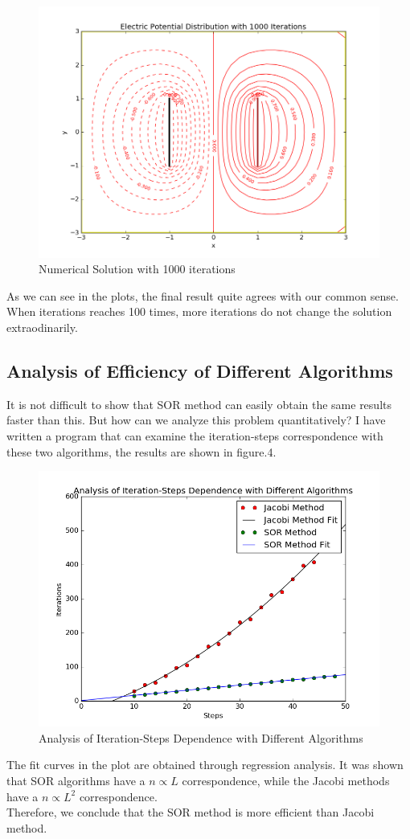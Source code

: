 \documentclass[10pt,a4paper]{article}
\begin{document}
	\begin{figure}[htbp]
		\centering
		\includegraphics[width=5in]{laplace_3.png}
		\caption{Numerical Solution with 1000 iterations}
	\end{figure}
	As we can see in the plots, the final result quite agrees with our common sense. When iterations reaches 100 times, more iterations do not change the solution extraodinarily. 
	
	\subsection{Analysis of Efficiency of Different Algorithms}
	It is not difficult to show that SOR method can easily obtain the same results faster than this.
	But how can we analyze this problem quantitatively? I have written a program that can examine the iteration-steps correspondence with these two algorithms, the results are shown in figure.4.\\
		\begin{figure}[htbp]
			\centering
			\includegraphics[width=5in]{laplace_4.png}
			\caption{Analysis of Iteration-Steps Dependence with Different Algorithms}
		\end{figure}
	The fit curves in the plot are obtained through regression analysis. It was shown that SOR algorithms have a $n\propto L$ correspondence, while the Jacobi methods have a $n\propto L^2$ correspondence.\\
	Therefore, we conclude that the SOR method is more efficient than Jacobi method.
	
\end{document}
